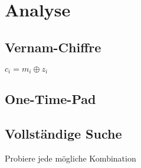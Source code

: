 \documentclass[a4paper,12pt]{article}
\begin{document}
\section{Analyse}

\subsection{Vernam-Chiffre}

$c_i = m_i \oplus z_i$

\subsection{One-Time-Pad}

\subsection{Vollständige Suche}

Probiere jede mögliche Kombination
\end{document}
